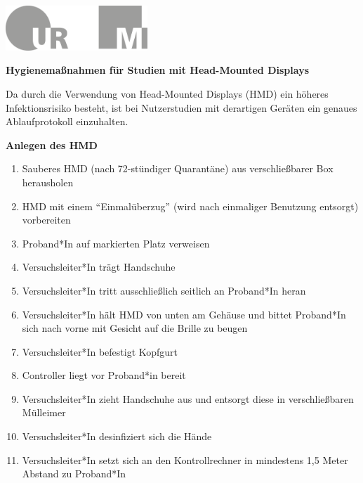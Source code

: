 \documentclass[24pt, a4paper, portrait]{article}
\begin{document}
\pagestyle{empty}

\raggedleft

\includegraphics[width=0.4\textwidth]{logo}

\vspace{1cm}
\sffamily
\centering
\huge

\textbf{Hygienemaßnahmen für Studien mit Head-Mounted Displays}

\vspace{1cm}

\raggedright
\Large

Da durch die Verwendung von Head-Mounted Displays (HMD) ein höheres Infektionsrisiko besteht, ist bei Nutzerstudien mit derartigen Geräten ein genaues Ablaufprotokoll einzuhalten.

\vspace{0.5cm}

\textbf{Anlegen des HMD}

\large

\begin{enumerate}
    \item Sauberes HMD (nach 72-stündiger Quarantäne) aus verschließbarer Box herausholen
    \item HMD mit einem “Einmalüberzug” (wird nach einmaliger Benutzung entsorgt) vorbereiten
    \item Proband*In auf markierten Platz verweisen 
    \item Versuchsleiter*In trägt Handschuhe
    \item Versuchsleiter*In tritt ausschließlich seitlich an Proband*In heran
    \item Versuchsleiter*In hält HMD von unten am Gehäuse und bittet Proband*In sich nach vorne mit Gesicht auf die Brille zu beugen 
    \item Versuchsleiter*In befestigt Kopfgurt 
    \item Controller liegt vor Proband*in bereit 
    \item Versuchsleiter*In zieht Handschuhe aus und entsorgt diese in verschließbaren Mülleimer
    \item Versuchsleiter*In desinfiziert sich die Hände
    \item Versuchsleiter*In setzt sich an den Kontrollrechner in mindestens 1,5 Meter Abstand zu Proband*In
\end{enumerate}
\end{document}
